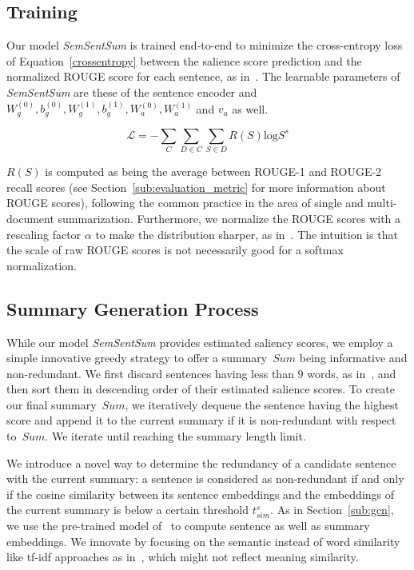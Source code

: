 \documentclass{article}
\begin{document}
\subsection{Training}

Our model \textit{SemSentSum} is trained end-to-end to minimize the cross-entropy loss of Equation~\ref{crossentropy} between the salience score prediction and the normalized ROUGE score for each sentence, as in~\citet{cao2015ranking, Yasunaga17}. The learnable parameters of \textit{SemSentSum} are these of the sentence encoder and $W_g^{(0)}, b_g^{(0)}, W_g^{(1)}, b_g^{(1)}, W_a^{(0)}, W_a^{(1)}$ and $v_a$ as well.

\begin{equation}
\label{crossentropy}
	\mathcal{L} = -\sum_C \sum_{D \in C} \sum_{S \in D} R(S)\textrm{log}S^s
\end{equation}

$R(S)$ is computed as being the average between ROUGE-1 and ROUGE-2 recall scores (see Section~\ref{sub:evaluation_metric} for more information about ROUGE scores), following the common practice in the area of single and multi-document summarization. Furthermore, we normalize the ROUGE scores with a rescaling factor $\alpha$ to make the distribution sharper, as in~\citet{Yasunaga17}. The intuition is that the scale of raw ROUGE scores is not necessarily good for a softmax normalization.

\subsection{Summary Generation Process}

While our model \textit{SemSentSum} provides estimated saliency scores, we employ a simple innovative greedy strategy to offer a summary~$Sum$ being informative and non-redundant. We first discard sentences having less than $9$ words, as in~\citet{erkan2004lexrank}, and then sort them in descending order of their estimated salience scores. To create our final summary~$Sum$, we iteratively dequeue the sentence having the highest score and append it to the current summary if it is non-redundant with respect to~$Sum$. We iterate until reaching the summary length limit.

We introduce a novel way to determine the redundancy of a candidate sentence with the current summary: a sentence is considered as non-redundant if and only if the cosine similarity between its sentence embeddings and the embeddings of the current summary is below a certain threshold $t_{sim}^s$. As in Section~\ref{sub:gcn}, we use the pre-trained model of~\citet{pgj2017unsup} to compute sentence as well as summary embeddings. We innovate by focusing on the semantic instead of word similarity like tf-idf approaches as in~\citet{hong2014improving, cao2015ranking, Yasunaga17, CaoLLW17}, which might not reflect meaning similarity.
\end{document}
